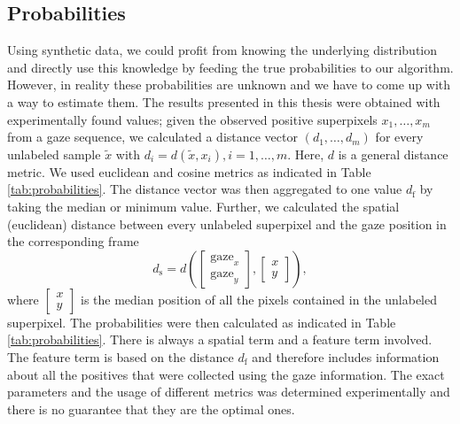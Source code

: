 \subsection{Probabilities}
Using synthetic data, we could profit from knowing the underlying distribution and directly use this knowledge by feeding the true probabilities to our algorithm. 
However, in reality these probabilities are unknown and we have to come up with a way to estimate them. 
The results presented in this thesis were obtained with experimentally found values; given the observed positive superpixels $x_1,\dots,x_m$ from a gaze sequence, we calculated a distance vector $(d_1,\dots,d_m)$ for every unlabeled sample $\tilde x$ with $d_i = d(\tilde x, x_i), i = 1,\dots,m.$
Here, $d$ is a general distance metric. We used euclidean and cosine metrics as indicated in Table \ref{tab:probabilities}. 
The distance vector was then aggregated to one value $d_{\text{f}}$ by taking the median or minimum value. 
Further, we calculated the spatial (euclidean) distance between every unlabeled superpixel and the gaze position in the corresponding frame 
$$d_\text{s} = d\left(\begin{bmatrix} \text{gaze}_x \\ \text{gaze}_y \end{bmatrix}, \begin{bmatrix} x \\ y \end{bmatrix}\right),$$
where $\begin{bmatrix} x \\ y \end{bmatrix}$ is the median position of all the pixels contained in the unlabeled superpixel.
The probabilities were then calculated as indicated in Table \ref{tab:probabilities}.
There is always a spatial term and a feature term involved. The feature term is based on the distance $d_{\text{f}}$ and therefore includes information about all the positives that were collected using the gaze information. The exact parameters and the usage of different metrics was determined experimentally and there is no guarantee that they are the optimal ones.
